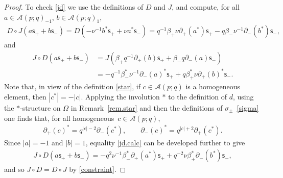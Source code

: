 \documentclass[pdftex]{sigma}
\numberwithin{equation}{section}
\def\AWeyl#1#2{{\mathcal{A}}(#1;#2)}
\begin{document}
\begin{proof}
To check \eqref{jd} we use the def\/initions of $D$ and $J$, and compute, for all $a\in \AWeyl p q_{-1}$, $b\in \AWeyl p q_{1}$,
\begin{gather*}
D\circ J(a {\mathsf{s}}_++b {\mathsf{s}}_-) = D(-\nu^{-1} b^*{\mathsf{s}}_+ + \nu a^*{\mathsf{s}}_-)
 = q^{-1}\beta_+\nu\partial_+ (a^* ) {\mathsf{s}}_+ - q\beta_-\nu^{-1}\partial_- (b^* ) {\mathsf{s}}_-,
\end{gather*}
and
\begin{align}
J\circ D(a {\mathsf{s}}_++b {\mathsf{s}}_-) &= J(\beta_+ q^{-1}\partial_+(b) {\mathsf{s}}_+ + \beta_- q \partial_-(a) {\mathsf{s}}_-)\nonumber \\
& = -q^{-1}\beta^*_-\nu^{-1}\partial_-(a)^*{\mathsf{s}}_+ + q\beta^*_+\nu\partial_+(b)^* {\mathsf{s}}_-.\label{jd.calc}
\end{align}
Note that, in view of the def\/inition \eqref{star}, if $c\in \AWeyl p q$ is a homogeneous element, then $|c^*| = -|c|$. Applying the involution $*$ to the def\/inition of $d$, using the $*$-structure on $\Omega$ in Remark~\ref{rem.star} and then the def\/initions of $\sigma_\pm$~\eqref{sigma} one f\/inds that, for all homogeneous~$c\in \AWeyl p q$,
\begin{gather*}
\partial_+(c)^* = q^{|c|-2}\partial_- (c^* ), \qquad \partial_-(c)^* = q^{|c|+2}\partial_+ (c^* ).
\end{gather*}
Since $|a|=-1$ and $|b|=1$, equality \eqref{jd.calc} can be developed further to give
\begin{gather*}
J\circ D(a {\mathsf{s}}_++b {\mathsf{s}}_-) = -q^2\nu^{-1}\beta_-^*\partial_+(a^*) {\mathsf{s}}_+ + q^{-2}\nu\beta_+^*\partial_-(b^*) {\mathsf{s}}_-,
\end{gather*}
and so $J\circ D = D\circ J$ by \eqref{constraint}.


\end{proof}
\end{document}
